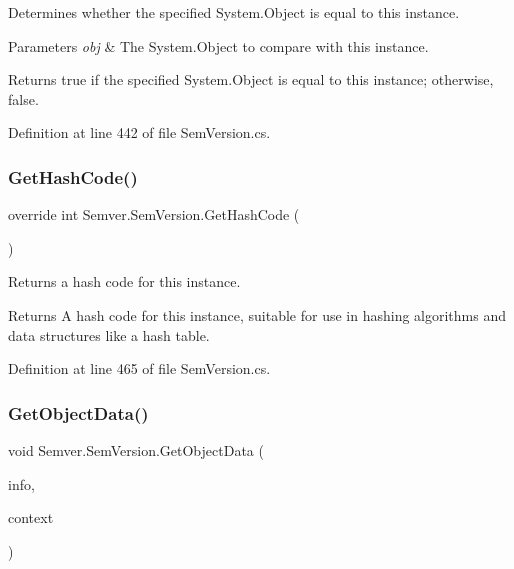 Determines whether the specified System.\+Object is equal to this instance. 


\begin{DoxyParams}{Parameters}
{\em obj} & The System.\+Object to compare with this instance.\\
\hline
\end{DoxyParams}
\begin{DoxyReturn}{Returns}
{\ttfamily true} if the specified System.\+Object is equal to this instance; otherwise, {\ttfamily false}. 
\end{DoxyReturn}


Definition at line 442 of file Sem\+Version.\+cs.

\mbox{\label{class_semver_1_1_sem_version_ac570f6109ec0a58cbe5127b7505c654d}} 
\subsubsection{\texorpdfstring{GetHashCode()}{GetHashCode()}}
{\footnotesize\ttfamily override int Semver.\+Sem\+Version.\+Get\+Hash\+Code (\begin{DoxyParamCaption}{ }\end{DoxyParamCaption})}



Returns a hash code for this instance. 

\begin{DoxyReturn}{Returns}
A hash code for this instance, suitable for use in hashing algorithms and data structures like a hash table. 
\end{DoxyReturn}


Definition at line 465 of file Sem\+Version.\+cs.

\mbox{\label{class_semver_1_1_sem_version_ab7a3c2f630b6220ecb7c05c21aea9eb5}} 
\subsubsection{\texorpdfstring{GetObjectData()}{GetObjectData()}}
{\footnotesize\ttfamily void Semver.\+Sem\+Version.\+Get\+Object\+Data (\begin{DoxyParamCaption}\item[{Serialization\+Info}]{info,  }\item[{Streaming\+Context}]{context }\end{DoxyParamCaption})}



